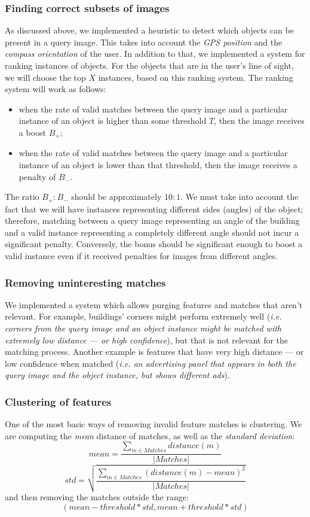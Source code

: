 \documentclass[a4paper,onecolumn,oneside,titlepage,12pt]{report}
\begin{document}
\subsubsection{Finding correct subsets of images}
As discussed above, we implemented a heuristic to detect which objects can be present in a query image. This takes into account the \emph{GPS position} and the \emph{compass orientation} of the user.
In addition to that, we implemented a system for ranking instances of objects. For the objects that are in the user's line of sight, we will choose the top $X$ instances, based on this ranking system.
The ranking system will work as follows:
\begin{itemize}
	\item when the rate of valid matches between the query image and a particular instance of an object is higher than some threshold $T$, then the image receives a boost $B_+$;
	\item when the rate of valid matches between the query image and a particular instance of an object is lower than that threshold, then the image receives a penalty of $B_-$.
\end{itemize}
The ratio $B_+ : B_-$ should be approximately $10 : 1$. We must take into account the fact that we will have instances representing different sides (angles) of the object; therefore, matching between a query image representing an angle of the building and a valid instance representing a completely different angle should not incur a significant penalty. Conversely, the bonus should be significant enough to boost a valid instance even if it received penalties for images from different angles.

\subsubsection{Removing uninteresting matches}
We implemented a system which allows purging features and matches that aren't relevant. For example, buildings' corners might perform extremely well (\emph{i.e. corners from the query image and an object instance might be matched with extremely low distance --- or high confidence}), but that is not relevant for the matching process. Another example is features that have very high distance --- or low confidence when matched (\emph{i.e. an advertising panel that appears in both the query image and the object instance, but shows different ads}).

\subsubsection{Clustering of features}
One of the most basic ways of removing invalid feature matches is clustering. We are computing the \emph{mean} distance of matches, as well as the \emph{standard deviation}:
$$
mean = \frac{\sum_{m \in Matches}distance(m)}{|Matches|}
$$
$$
std = \sqrt{\frac{\sum_{m \in Matches} (distance(m) - mean)^2}{|Matches|}}
$$
and then removing the matches outside the range:
$$
(mean - threshold * std, mean + threshold * std)
$$
\end{document}
